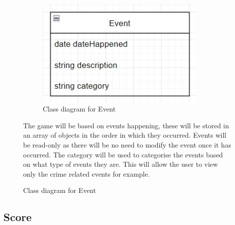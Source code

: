 \begin{figure} [H]
    \centering
    \begin{minipage}{0.45\textwidth}
        \begin{figure}[H]
        \centering
        \includegraphics[width=0.9\textwidth]{images/design/class-event.jpg}
        \caption{Class diagram for Event}
        \label{fig:design-class-event}
        \end{figure}
    \end{minipage} \hfill
    \begin{minipage}{0.45\textwidth}
        The game will be based on events happening, these will be stored in an array of objects in the order in which they occurred. Events will be read-only as there will be no need to modify the event once it has occurred. The category will be used to categorise the events based on what type of events they are. This will allow the user to view only the crime related events for example.
    \end{minipage}
\end{figure}

\subsection{Score}

